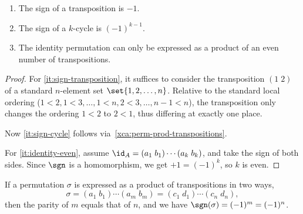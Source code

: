 \begin{lemma}\label{lem:sign-properties}
  \begin{enumerate}
  \item\label{it:sign-transposition}
    The sign of a transposition is $-1$.
  \item\label{it:sign-cycle}
    The sign of a $k$-cycle is $(-1)^{k-1}$.
  \item\label{it:identity-even}
    The identity permutation can only be expressed as a product
    of an even number of transpositions.
  \end{enumerate}
\end{lemma}

\begin{proof}
  For \ref{it:sign-transposition},
  it suffices to consider the transposition $(1\;2)$ of a 
  standard $n$-element set $\set{1,2,\dots,n}$.
  Relative to the standard local ordering 
  ($1<2,1<3,\dots,1<n,2<3,\ldots,n-1<n$),
  the transposition only changes the ordering $1<2$ to $2<1$,
  thus differing at exactly one place.

  Now \ref{it:sign-cycle} follows via~\cref{xca:perm-prod-transpositions}.

  For \ref{it:identity-even}, assume $\id_A = (a_1\;b_1)\cdots(a_k\;b_k)$,
  and take the sign of both sides. Since $\sgn$ is a homomorphism,
  we get $+1 = (-1)^k$, so $k$ is even.
\end{proof}

\begin{corollary}\label{cor:sign-defined}
  If a permutation $\sigma$ is expressed as a product of transpositions in two ways,
  \[
    \sigma = (a_1\;b_1)\cdots(a_m\;b_m)
    = (c_1\;d_1)\cdots(c_n\;d_n),
  \]
  then the parity of $m$ equals that of $n$,
  and we have $\sgn(\sigma)=(-1)^m=(-1)^n$.
\end{corollary}

